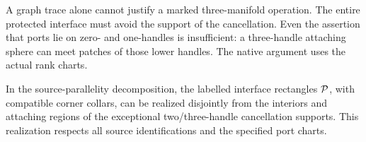 A graph trace alone cannot justify a marked three-manifold operation. The
entire protected interface must avoid the support of the cancellation.
Even the assertion that ports lie on zero- and one-handles is insufficient:
a three-handle attaching sphere can meet patches of those lower handles.
The native argument uses the actual rank charts.

\begin{lemma}
\label{lem:separation}
In the source-parallelity decomposition, the labelled interface rectangles
$\mathcal P$, with compatible corner collars, can be realized disjointly from
the interiors and attaching regions of the exceptional two/three-handle
cancellation supports. This realization respects all source identifications
and the specified port charts.
\end{lemma}

